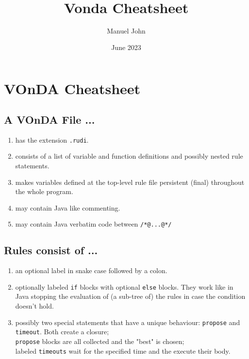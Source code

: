 \documentclass[5pt]{article}
\title{Vonda Cheatsheet}
\author{Manuel John}
\date{June 2023}
\begin{document}
\singlespacing
{}
\section*{\centering VOnDA Cheatsheet}
    \begin{multicols}{2}
        \begin{bodybox}{\subsection*{\normalsize A VOnDA File ...}}
        \normalsize
        \begin{enumerate}[label=...]
        \itemsep0.5em
             \item has the extension \verb|.rudi|.
             \item  consists of a list of variable and function definitions and possibly nested rule statements.
             \item  makes variables defined at the top-level rule file persistent (final) throughout the whole program.
             \item may contain Java like commenting.
             \item may contain Java verbatim code between \verb|/*@...@*/|
        \end{enumerate}
        \end{bodybox}
        \begin{bodybox}{\subsection*{\normalsize Rules consist of ...}}
        \begin{enumerate}[label=...]
        \itemsep0.5em
            \item an optional label in snake case followed by a colon.
            \item optionally labeled \verb|if| blocks with optional \verb|else| blocks. They work like in Java stopping the evaluation of (a sub-tree of) the rules in case the condition doesn't hold.
            \item possibly two special statements that have a unique behaviour: \verb|propose| and \verb|timeout|. Both create a closure;\\
            \verb|propose| blocks are all collected and the "best" is chosen;\\
            labeled \verb|timeouts| wait for the specified time and the execute their body.

\end{enumerate}
\end{bodybox}
\end{multicols}
\end{document}
